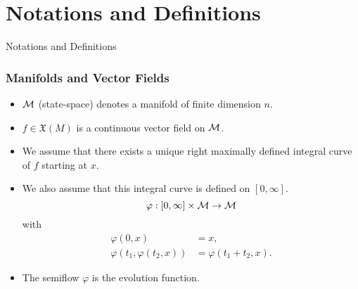 \section{Notations and Definitions}

\begin{frame}
    Notations and Definitions


\end{frame}


\begingroup
\small

\begin{frame}
    \frametitle{Manifolds and Vector Fields}

    \begin{itemize}
        \item $\mathcal{M}$ (state-space) denotes a manifold of finite dimension $n$.
        \item $f \in \mathfrak{X}(M)$ is a continuous vector field on $\mathcal{M}$.
        \item We assume that there exists a unique right maximally defined
        integral curve of $f$ starting at $x$.
        \item We also assume that this integral curve is defined on $[0,
        \infty]$.
        \[
            \varphi: [0, \infty] \times \mathcal{M} \rightarrow \mathcal{M}
        \]
        with 
        \begin{align*}
            \varphi(0, x) &= x, \\
            \varphi(t_1, \varphi(t_2,x)) &= \varphi(t_1+t_2, x).
        \end{align*}
        \item The semiflow $\varphi$ is the evolution function.
    \end{itemize}
\end{frame}


